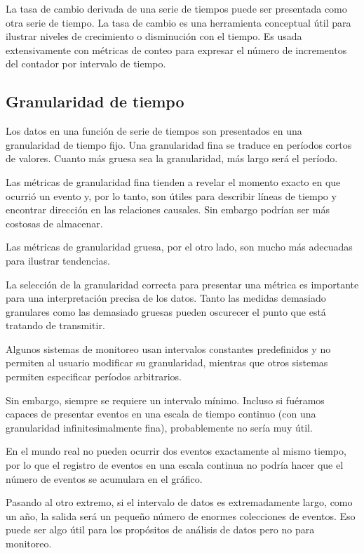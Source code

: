La tasa de cambio derivada de una serie de tiempos puede ser presentada como
otra serie de tiempo. La tasa de cambio es una herramienta conceptual útil para
ilustrar niveles de crecimiento o disminución con el tiempo. Es usada
extensivamente con métricas de conteo para expresar el número de incrementos
del contador por intervalo de tiempo.

\subsection*{Granularidad de tiempo}
\label{granularidad_de_tiempo}

Los datos en una función de serie de tiempos son presentados en una
granularidad de tiempo fijo. Una granularidad fina se traduce en períodos
cortos de valores. Cuanto más gruesa sea la granularidad, más largo será el
período.

Las métricas de granularidad fina tienden a revelar el momento exacto en que
ocurrió un evento y, por lo tanto, son útiles para describir líneas de tiempo y
encontrar dirección en las relaciones causales. Sin embargo podrían ser más
costosas de almacenar.

Las métricas de granularidad gruesa, por el otro lado, son mucho más adecuadas
para ilustrar tendencias.

La selección de la granularidad correcta para presentar una métrica es
importante para una interpretación precisa de los datos. Tanto las medidas
demasiado granulares como las demasiado gruesas pueden oscurecer el punto que
está tratando de transmitir.

Algunos sistemas de monitoreo usan intervalos constantes predefinidos y no
permiten al usuario modificar su granularidad, mientras que otros sistemas
permiten especificar períodos arbitrarios.

Sin embargo, siempre se requiere un intervalo mínimo. Incluso si fuéramos
capaces de presentar eventos en una escala de tiempo continuo (con una
granularidad infinitesimalmente fina), probablemente no sería muy útil.

En el mundo real no pueden ocurrir dos eventos exactamente al mismo tiempo, por
lo que el registro de eventos en una escala continua no podría hacer que el
número de eventos se acumulara en el gráfico.

Pasando al otro extremo, si el intervalo de datos es extremadamente largo, como
un año, la salida será un pequeño número de enormes colecciones de eventos. Eso
puede ser algo útil para los propósitos de análisis de datos pero no para
monitoreo.


